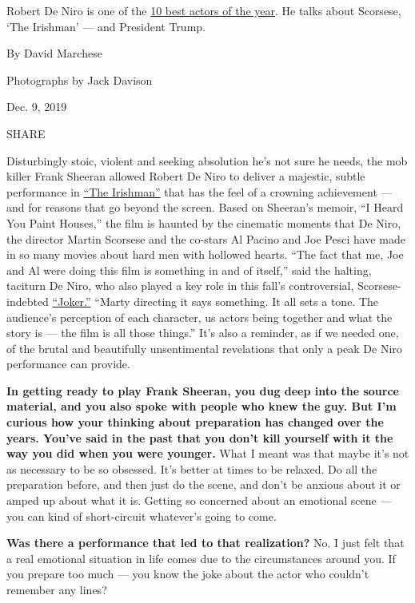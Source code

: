 Robert De Niro is one of the
\href{https://www.nytimes3xbfgragh.onion/interactive/2019/12/09/magazine/best-actors.html}{10
best actors of the year}. He talks about Scorsese, `The Irishman' ---
and President Trump.

By David Marchese

Photographs by Jack Davison

Dec. 9, 2019

SHARE

Disturbingly stoic, violent and seeking absolution he's not sure he
needs, the mob killer Frank Sheeran allowed Robert De Niro to deliver a
majestic, subtle performance in
\href{https://www.nytimes3xbfgragh.onion/2019/09/27/movies/the-irishman-review.html}{``The
Irishman''} that has the feel of a crowning achievement --- and for
reasons that go beyond the screen. Based on Sheeran's memoir, ``I Heard
You Paint Houses,'' the film is haunted by the cinematic moments that De
Niro, the director Martin Scorsese and the co-stars Al Pacino and Joe
Pesci have made in so many movies about hard men with hollowed hearts.
``The fact that me, Joe and Al were doing this film is something in and
of itself,'' said the halting, taciturn De Niro, who also played a key
role in this fall's controversial, Scorsese-indebted
\href{https://www.nytimes3xbfgragh.onion/2019/10/03/movies/joker-review.html}{``Joker.''}
``Marty directing it says something. It all sets a tone. The audience's
perception of each character, us actors being together and what the
story is --- the film is all those things.'' It's also a reminder, as if
we needed one, of the brutal and beautifully unsentimental revelations
that only a peak De Niro performance can provide.

\textbf{In getting ready to play Frank Sheeran, you dug deep into the
source material, and you also spoke with people who knew the guy. But
I'm curious how your thinking about preparation has changed over the
years. You've said in the past that you don't kill yourself with it the
way you did when you were younger.} What I meant was that maybe it's not
as necessary to be so obsessed. It's better at times to be relaxed. Do
all the preparation before, and then just do the scene, and don't be
anxious about it or amped up about what it is. Getting so concerned
about an emotional scene --- you can kind of short-circuit whatever's
going to come.

\textbf{Was there a performance that led to that realization?} No. I
just felt that a real emotional situation in life comes due to the
circumstances around you. If you prepare too much --- you know the joke
about the actor who couldn't remember any lines?

